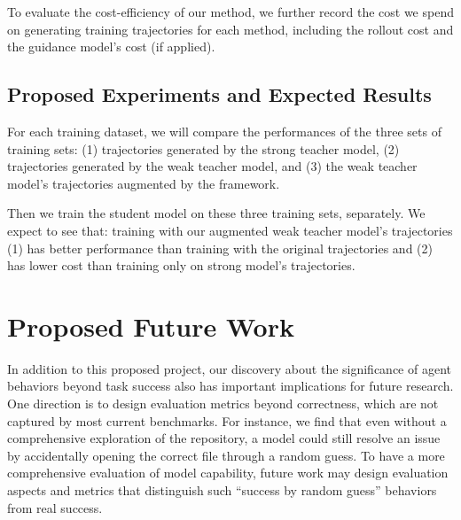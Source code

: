 To evaluate the cost-efficiency of our method, we further record the cost we spend on generating training trajectories for each method, including the rollout cost and the guidance model's cost (if applied).


\subsection{Proposed Experiments and Expected Results}
For each training dataset, we will compare the performances of the three sets of training sets: (1) trajectories generated by the strong teacher model, (2) trajectories generated by the weak teacher model, and (3) the weak teacher model's trajectories augmented by the \plusname framework.

Then we train the student model on these three training sets, separately. We expect to see that: training with our augmented weak teacher model's trajectories (1) has better performance than training with the original trajectories and (2) has lower cost than training only on strong model's trajectories.




\section{Proposed Future Work}
In addition to this proposed project, our discovery about the significance of agent behaviors beyond task success also has important implications for future research.
One direction is to design evaluation metrics beyond correctness, which are not captured by most current benchmarks. 
For instance, we find that even without a comprehensive exploration of the repository, a model could still resolve an issue by accidentally opening the correct file through a random guess. 
To have a more comprehensive evaluation of model capability, future work may design evaluation aspects and metrics that distinguish such ``success by random guess'' behaviors from real success.